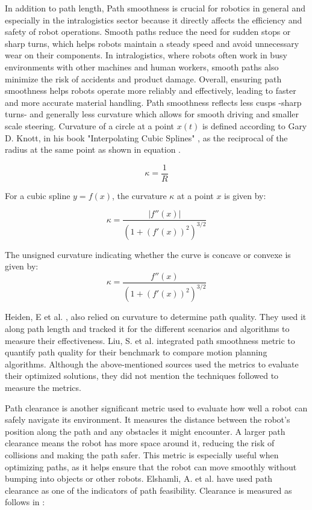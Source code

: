 In addition to path length, Path smoothness is crucial for robotics in general and especially 
in the intralogistics sector because it directly affects the efficiency and safety of robot 
operations. Smooth paths reduce the need for sudden stops or sharp turns, which helps robots 
maintain a steady speed and avoid unnecessary wear on their components. In intralogistics, 
where robots often work in busy environments with other machines and human workers, smooth 
paths also minimize the risk of accidents and product damage. Overall, ensuring path 
smoothness helps robots operate more reliably and effectively, leading to faster and 
more accurate material handling. Path smoothness reflects less cusps -sharp turns- and generally
less curvature which allows for smooth driving and smaller scale steering.
Curvature of a circle at a point \(x(t)\) is defined according to Gary D. Knott, in his book 
"Interpolating Cubic Splines" \cite{R34}, as the reciprocal of the radius at the same point as shown in
equation .

\begin{equation}
    \kappa = \frac{1}{R}
    \label{kurv}
\end{equation}

For a cubic spline \( y = f(x) \), the curvature \( \kappa \) at a point \( x \) is given by:

\begin{equation}
\kappa = \frac{|f''(x)|}{\left(1 + \left(f'(x)\right)^2\right)^{3/2}}
\end{equation}

The unsigned curvature indicating whether the curve is concave or convexe is given by:
\begin{equation}
    \kappa = \frac{f''(x)}{\left(1 + \left(f'(x)\right)^2\right)^{3/2}}
\end{equation}

Heiden, E et al. \cite{R23}, also relied on curvature to determine path quality. They used it along 
path length and tracked it for the different scenarios and algorithms to measure their effectiveness.
Liu, S. et al. integrated path smoothness metric to quantify path quality for their benchmark to compare
motion planning algorithms\cite{R35}.
Although the above-mentioned sources used the metrics to evaluate their optimized solutions,
they did not mention the techniques  followed to measure the metrics.

Path clearance is another significant metric used to evaluate how well a robot can safely navigate 
its environment. It measures the distance between the robot's position along the path and any obstacles 
it might encounter. A larger path clearance means the robot has more space around it, reducing the risk 
of collisions and making the path safer. This metric is especially useful when optimizing paths, as it 
helps ensure that the robot can move smoothly without bumping into objects or other robots. 
Elshamli, A. et al. \cite{R17} have used path clearance as one of the indicators of path feasibility.
Clearance is measured as follows in :

